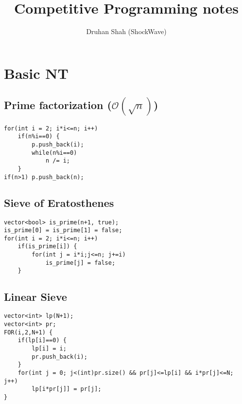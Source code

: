 \documentclass{article}
\author{Druhan Shah (ShockWave)}
\title{Competitive Programming notes}
\begin{document}
    \maketitle
    \tableofcontents

	

    \section{Basic NT}
        \subsection{Prime factorization ($\mathcal{O}(\sqrt{n})$)}
        

        \begin{lstlisting}
for(int i = 2; i*i<=n; i++)
    if(n%i==0) {
        p.push_back(i);
        while(n%i==0)
            n /= i;
    }
if(n>1) p.push_back(n);   \end{lstlisting}


        \subsection{Sieve of Eratosthenes}

        \begin{lstlisting}
vector<bool> is_prime(n+1, true);
is_prime[0] = is_prime[1] = false;
for(int i = 2; i*i<=n; i++)
    if(is_prime[i]) {
        for(int j = i*i;j<=n; j+=i)
            is_prime[j] = false;
    }   \end{lstlisting}

        \subsection{Linear Sieve}
        

        \begin{lstlisting}
vector<int> lp(N+1);
vector<int> pr;
FOR(i,2,N+1) {
    if(lp[i]==0) {
        lp[i] = i;
        pr.push_back(i);
    }
    for(int j = 0; j<(int)pr.size() && pr[j]<=lp[i] && i*pr[j]<=N; j++)
        lp[i*pr[j]] = pr[j];
}       \end{lstlisting}
\end{document}
